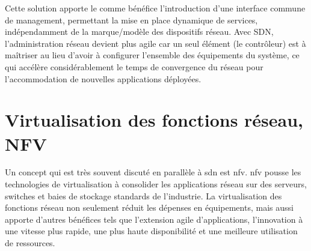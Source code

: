 
Cette solution apporte le comme bénéfice l'introduction d'une interface commune de management, permettant la mise en place dynamique de services, indépendamment de la marque/modèle des dispositifs réseau. Avec SDN, l'administration réseau devient plus agile car un seul élément (le contrôleur) est à maîtriser au lieu d'avoir à configurer l'ensemble des équipements du système, ce qui accélère considérablement le temps de convergence du réseau pour l'accommodation de nouvelles applications déployées.





\section{Virtualisation des fonctions réseau, NFV}


Un concept qui est très souvent discuté en parallèle à \gls{sdn} est \gls{nfv}. \gls{nfv} pousse les technologies de virtualisation à consolider les applications réseau sur des serveurs, switches et baies de stockage standards de l'industrie. La virtualisation des fonctions réseau non seulement réduit les dépenses en équipements, mais aussi apporte d'autres bénéfices tels que l'extension agile d'applications, l'innovation à une vitesse plus rapide, une plus haute disponibilité et une meilleure utilisation de ressources.

